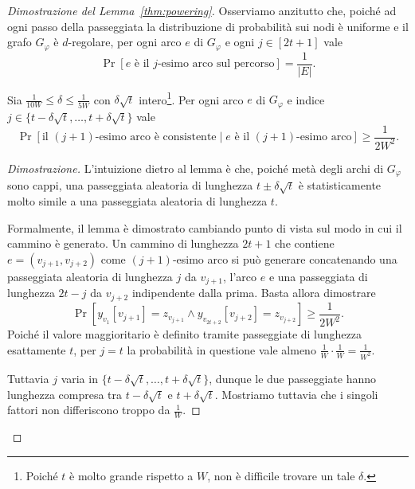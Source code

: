 \begin{proof}[Dimostrazione del Lemma~\ref{thm:powering}]
	Osserviamo anzitutto che, poiché ad ogni passo della passeggiata la
	distribuzione di probabilità sui nodi è uniforme e il grafo $G_\varphi$ è
	$d$-regolare, per ogni arco $e$ di $G_\varphi$ e ogni
	$j \in [2t + 1]$ vale
		\[
			\Pr[e \text{ è il $j$-esimo arco sul percorso}] = \frac{1}{|E|}.
		\]

	\begin{lemma} \label{thm:mid-archi-consistenti}
		Sia $\frac1{10 W} \le \delta \le \frac1{5 W}$ con $\delta \sqrt{t}$
		intero\footnote{Poiché $t$ è molto grande rispetto a $W$, non è
		difficile trovare un tale $\delta$.}.
		Per ogni arco $e$ di $G_\varphi$ e indice
		$j \in \{ t - \delta \sqrt{t}, \ldots, t + \delta \sqrt{t} \}$ vale
		\[
			\Pr[\text{il $(j + 1)$-esimo arco è consistente} \mid
				e \text{ è il $(j + 1)$-esimo arco}] \ge \frac1{2 W^2}.
		\]
	\end{lemma}

	\begin{proof}[Dimostrazione]
		L'intuizione dietro al lemma è che, poiché metà degli archi di
		$G_\varphi$ sono cappi, una passeggiata aleatoria di lunghezza
		$t \pm \delta \sqrt{t}$ è statisticamente molto simile a una passeggiata
		aleatoria di lunghezza $t$.

		Formalmente, il lemma è dimostrato cambiando punto di vista sul modo in
		cui il cammino è generato. Un cammino di lunghezza $2t + 1$ che contiene
		$e = (v_{j + 1}, v_{j + 2})$ come $(j + 1)$-esimo arco si può generare
		concatenando una passeggiata aleatoria di lunghezza $j$ da $v_{j + 1}$,
		l'arco $e$ e una passeggiata di lunghezza $2t - j$ da $v_{j + 2}$
		indipendente dalla prima. Basta allora dimostrare
		\[
			\Pr[y_{v_1}[ v_{j + 1} ] = z_{v_{j + 1}} \land
				y_{v_{2t + 2}}[ v_{j + 2} ] = z_{v_{j + 2}}]
				\ge \frac1{2 W^2}.
		\]
		Poiché il valore maggioritario è definito tramite passeggiate di lunghezza
		esattamente $t$, per $j = t$ la probabilità in questione vale almeno
		$\frac1{W} \cdot \frac1{W} = \frac1{W^2}$.

		Tuttavia $j$ varia in $\{t - \delta \sqrt{t}, \ldots, t + \delta \sqrt{t}\}$,
		dunque le due passeggiate hanno lunghezza compresa tra $t - \delta \sqrt{t}$ e
		$t + \delta \sqrt{t}$. Mostriamo tuttavia che i singoli fattori non
		differiscono troppo da $\frac1W$.


\end{proof}
\end{proof}
